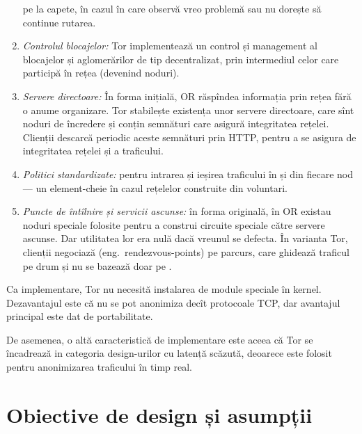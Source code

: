\begin{enumerate}[(1)]
    pe la capete, în cazul în care observă vreo problemă sau nu dorește
    să continue rutarea.
  \item \textit{Controlul blocajelor:} Tor implementează un control și
    management al blocajelor și a\-glo\-me\-ră\-ri\-lor de tip decentralizat,
    prin intermediul celor care participă în rețea (devenind noduri).
  \item \textit{Servere directoare:} În forma inițială, OR răspîndea
    informația prin rețea fără o anume organizare. Tor stabilește
    existența unor servere directoare, care sînt noduri de încredere
    și conțin semnături care asigură integritatea rețelei. Clienții
    descarcă periodic aceste semnături prin HTTP, pentru a se asigura
    de integritatea rețelei și a traficului.
  \item \textit{Politici standardizate:} pentru intrarea și ieșirea
    traficului în și din fiecare nod --- un element-cheie în cazul
    rețelelor construite din voluntari.
  \item \textit{Puncte de întîlnire și servicii ascunse:} în forma
    originală, în OR existau noduri speciale folosite pentru a construi
    circuite speciale către servere ascunse. Dar utilitatea lor era nulă dacă
    vreunul se defecta. În varianta Tor, clienții negociază  (eng.\ rendezvous-points) pe parcurs, care ghidează
    traficul pe drum și nu se bazează doar pe .
\end{enumerate}

Ca implementare, Tor nu necesită instalarea de module speciale în kernel.
Dezavantajul este că nu se pot anonimiza decît protocoale TCP, dar avantajul
principal este dat de portabilitate.

De asemenea, o altă caracteristică de implementare este aceea că Tor se 
încadrează in categoria design-urilor cu latență scăzută, deoarece este
folosit pentru anonimizarea traficului în timp real.



\section{Obiective de design și asumpții}


